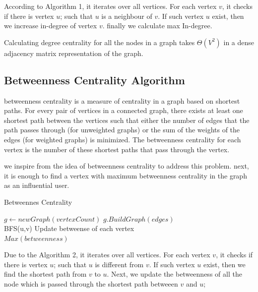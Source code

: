 \documentclass[twocolumn,11pt]{asme2ej}
\begin{document}
According to Algorithm 1, it iterates over all vertices. For each vertex $v$, it checks if there is vertex $u$; such that $u$ is a neighbour of $v$. If such vertex $u$ exist, then we increase in-degree of vertex $v$. finally we calculate max In-degree.

Calculating degree centrality for all the nodes in a graph takes $\Theta (V^2)$ in a dense adjacency matrix representation of the graph.

\subsection{Betweenness Centrality Algorithm}


 betweenness centrality is a measure of centrality in a graph based on shortest paths. For every pair of vertices in a connected graph, there exists at least one shortest path between the vertices such that either the number of edges that the path passes through (for unweighted graphs) or the sum of the weights of the edges (for weighted graphs) is minimized. The betweenness centrality for each vertex is the number of these shortest paths that pass through the vertex.\cite{updbc} 
 
we inspire from the idea of betweenness centrality to address this problem. next, it is enough to find a vertex with maximum betweenness centrality in the graph as an influential user.

\begin{algorithm}[H]
	\caption{Betweennes Centrality}
	\begin{algorithmic}[1]		
			\State $g \leftarrow new Graph(vertexCount)$ 
			\State $g.BuildGraph(edges)$
			\\
						\State BFS(u,v)         
						\State Update betweense of each vertex
					\EndIf
				\EndFor
			\EndFor	
			\\
			\Return $Max(betweenness)$
		\EndFunction	
	\end{algorithmic}
\end{algorithm}

Due to the Algorithm 2, it iterates over all vertices. For each vertex $v$, it checks if there is vertex $u$; such that $u$ is different from $v$. If such vertex $u$ exist, then we find the shortest path from $v$ to $u$. Next, we update the betweenness of all the node which is passed through the shortest path betweeen  $v$ and $u$;
\end{document}
